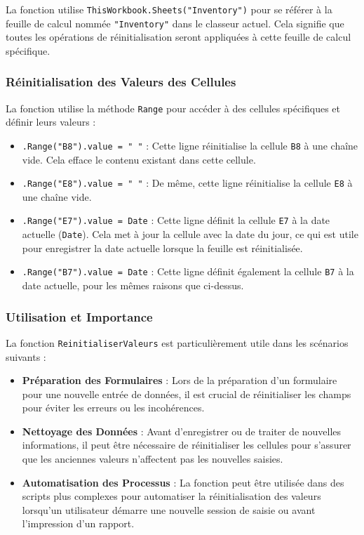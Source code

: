 \documentclass[a4paper, oneside, 12pt, final]{extreport}
\begin{document}
La fonction utilise \texttt{ThisWorkbook.Sheets("Inventory")} pour se référer à la feuille de calcul nommée \texttt{"Inventory"} dans le classeur actuel. Cela signifie que toutes les opérations de réinitialisation seront appliquées à cette feuille de calcul spécifique.

\subsubsection{Réinitialisation des Valeurs des Cellules}

La fonction utilise la méthode \texttt{Range} pour accéder à des cellules spécifiques et définir leurs valeurs :

\begin{itemize}
    \item \texttt{.Range("B8").value = " "} : Cette ligne réinitialise la cellule \texttt{B8} à une chaîne vide. Cela efface le contenu existant dans cette cellule.
    \item \texttt{.Range("E8").value = " "} : De même, cette ligne réinitialise la cellule \texttt{E8} à une chaîne vide.
    \item \texttt{.Range("E7").value = Date} : Cette ligne définit la cellule \texttt{E7} à la date actuelle (\texttt{Date}). Cela met à jour la cellule avec la date du jour, ce qui est utile pour enregistrer la date actuelle lorsque la feuille est réinitialisée.
    \item \texttt{.Range("B7").value = Date} : Cette ligne définit également la cellule \texttt{B7} à la date actuelle, pour les mêmes raisons que ci-dessus.
\end{itemize}

\subsubsection{Utilisation et Importance}

La fonction \texttt{ReinitialiserValeurs} est particulièrement utile dans les scénarios suivants :

\begin{itemize}
    \item \textbf{Préparation des Formulaires} : Lors de la préparation d'un formulaire pour une nouvelle entrée de données, il est crucial de réinitialiser les champs pour éviter les erreurs ou les incohérences.
    \item \textbf{Nettoyage des Données} : Avant d'enregistrer ou de traiter de nouvelles informations, il peut être nécessaire de réinitialiser les cellules pour s'assurer que les anciennes valeurs n'affectent pas les nouvelles saisies.
    \item \textbf{Automatisation des Processus} : La fonction peut être utilisée dans des scripts plus complexes pour automatiser la réinitialisation des valeurs lorsqu'un utilisateur démarre une nouvelle session de saisie ou avant l'impression d'un rapport.
\end{itemize}
\end{document}
